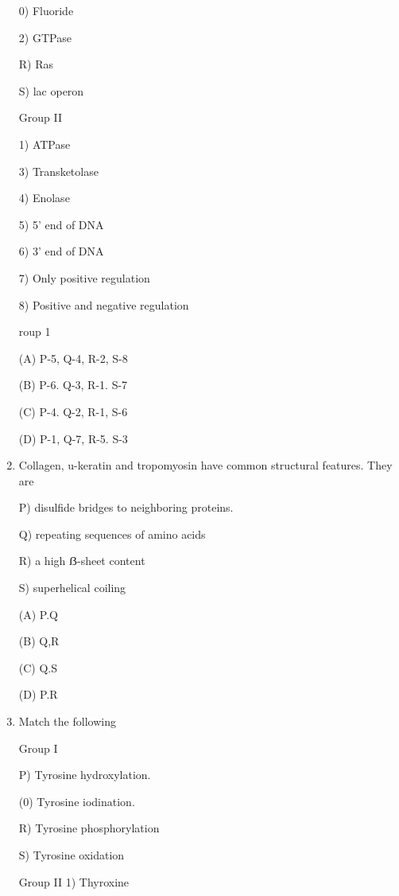 \documentclass[journal]{IEEEtran}
\begin{document}
\begin{enumerate}
\begin{minipage}{0.5\textwidth}
\begin{flushleft}
0) Fluoride

2) GTPase

R) Ras

S) lac operon

		\end{flushleft}
		\end{minipage}
	\begin{minipage}{0.5\textwidth}
		\begin{flushright}
Group II

1) ATPase

3) Transketolase

4) Enolase

5) 5' end of DNA

6) 3' end of DNA

7) Only positive regulation

8) Positive and negative regulation
		\end{flushright}
		\end{minipage}roup 1

(A) P-5, Q-4, R-2, S-8

(B) P-6. Q-3, R-1. S-7

(C) P-4. Q-2, R-1, S-6

(D) P-1, Q-7, R-5. S-3

\item{Collagen, u-keratin and tropomyosin have common structural features. They are

P) disulfide bridges to neighboring proteins.

Q) repeating sequences of amino acids

R) a high ẞ-sheet content

S) superhelical coiling

(A) P.Q

(B) Q,R

(C) Q.S

(D) P.R}

\item {Match the following}
\begin{minipage}{0.5\textwidth}
	\begin{flushleft}


Group I

P) Tyrosine hydroxylation.

(0) Tyrosine iodination.

R) Tyrosine phosphorylation

S) Tyrosine oxidation

		\end{flushleft}
		\end{minipage}
	\begin{minipage}{0.5\textwidth}
		\begin{flushright}
Group II
1) Thyroxine



\end{flushright}
\end{minipage}
\end{enumerate}
\end{document}
